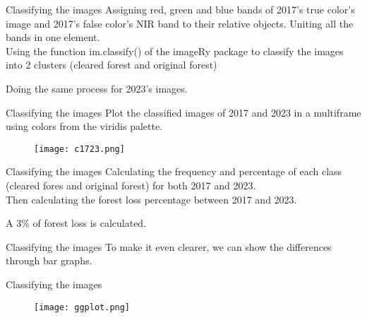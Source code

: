 \documentclass{beamer}
\begin{document}
\begin{frame}{Classifying the images}
    Assigning red, green and blue bands of 2017's true color's image and 2017's false color's NIR band to their relative objects.
    Uniting all the bands in one element. 
    \\ Using the function im.classify() of the imageRy package to classify the images into 2 clusters (cleared forest and original forest)
    
    \bigskip
    Doing the same process for 2023's images.
\end{frame}

\begin{frame}{Classifying the images}
    Plot the classified images of 2017 and 2023 in a multiframe using colors from the viridis palette.
    \bigskip
    
    \begin{figure}
        \texttt{[image: c1723.png]}
    \end{figure}
\end{frame}

\begin{frame}{Classifying the images}
    Calculating the frequency and percentage of each class (cleared fores and original forest) for both 2017 and 2023.
    \\ Then calculating the forest loss percentage between 2017 and 2023.
    
    A 3\% of forest loss is calculated.
\end{frame}

\begin{frame}{Classifying the images}
    To make it even clearer, we can show the differences through bar graphs. 
    
\end{frame}

\begin{frame}{Classifying the images}
    \begin{figure}
        \centering
        \texttt{[image: ggplot.png]}
    \end{figure}
\end{frame}
\end{document}
